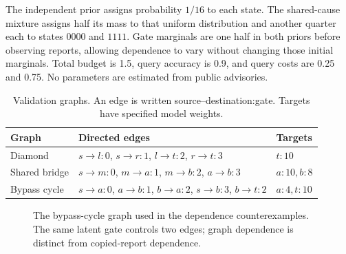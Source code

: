 \documentclass[manuscript,screen,nonacm]{acmart}
\begin{document}
The independent prior assigns probability $1/16$ to each state. The shared-cause mixture assigns half its mass to that uniform distribution and another quarter each to states $0000$ and $1111$. Gate marginals are one half in both priors before observing reports, allowing dependence to vary without changing those initial marginals. Total budget is 1.5, query accuracy is 0.9, and query costs are 0.25 and 0.75. No parameters are estimated from public advisories.

\begin{table}[t]
\caption{Validation graphs. An edge is written source--destination:gate. Targets have specified model weights.}
\label{tab:graphs}
\begin{tabularx}{\linewidth}{lXl}
\toprule
Graph & Directed edges & Targets \\
\midrule
Diamond & $s\!\to\!l:0$, $s\!\to\!r:1$, $l\!\to\!t:2$, $r\!\to\!t:3$ & $t:10$ \\
Shared bridge & $s\!\to\!m:0$, $m\!\to\!a:1$, $m\!\to\!b:2$, $a\!\to\!b:3$ & $a:10,b:8$ \\
Bypass cycle & $s\!\to\!a:0$, $a\!\to\!b:1$, $b\!\to\!a:2$, $s\!\to\!b:3$, $b\!\to\!t:2$ & $a:4,t:10$ \\
\bottomrule
\end{tabularx}
\end{table}

\begin{figure}[t]
\centering
{}
\caption{The bypass-cycle graph used in the dependence counterexamples. The same latent gate controls two edges; graph dependence is distinct from copied-report dependence.}
\end{figure}
\end{document}
